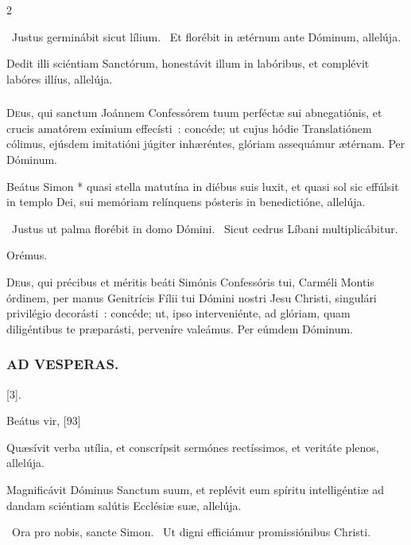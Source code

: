 \documentclass[9pt,twoside]{extarticle}
\begin{document}
\begin{multicols}{2}
{\begin{tightlist}{}
\item {}~Justus germinábit sicut lílium. ~Et florébit in ætérnum ante Dóminum, allelúja.
\item {} Dedit illi sciéntiam Sanctórum, honestávit illum in labóribus, et complévit labóres illíus, allelúja.
\end{tightlist}

\subsubsection*{\center {}}
\lettrine{D}eus, qui sanctum Joánnem Confessórem tuum perféctæ sui abnegatiónis, et crucis amatórem exímium effecísti~: concéde; ut cujus hódie Translatiónem cólimus, ejúsdem imitatióni júgiter inhæréntes, glóriam assequámur ætérnam. Per Dóminum.

\begin{tightlist}{}
\item {} Beátus Simon * quasi stella matutína in diébus suis luxit, et quasi sol sic effúlsit in templo Dei, sui memóriam relínquens pósteris in benedictióne, allelúja.
\item {}~Justus ut palma florébit in domo Dómini. ~Sicut cedrus Líbani multiplicábitur.
\item Orémus. \hfill {}
\end{tightlist}
\lettrine{D}eus, qui précibus et méritis beáti Simónis Confessóris tui, Carméli Montis órdinem, per manus Genitrícis Fílii tui Dómini nostri Jesu Christi, singulári privilégio decorásti~: concéde; ut, ipso interveniénte, ad glóriam, quam diligéntibus te præparásti, perveníre valeámus. Per eúmdem Dóminum.

\subsubsection*{\center \textsc{AD VESPERAS.}}
\begin{tightlist}{}
\item {} [3].
\item {} Beátus vir, [93]
\item {}
\item {} Quæsívit verba utília, et conscrípsit sermónes rectíssimos, et veritáte plenos, allelúja.
\item {} Magnificávit Dóminus Sanctum suum, et replévit eum spíritu intelligéntiæ ad dandam sciéntiam salútis Ecclésiæ suæ, allelúja.
\item {}~Ora pro nobis, sancte Simon. ~Ut digni efficiámur promissiónibus Christi.
\item {}
\end{tightlist}

}
\end{multicols}
\end{document}
